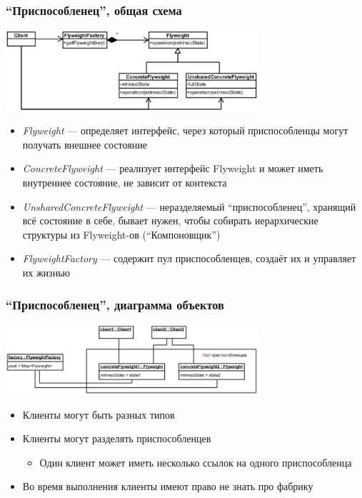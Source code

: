\documentclass[xetex,mathserif,serif]{beamer}
\begin{document}
    \begin{frame}
        \frametitle{``Приспособленец'', общая схема}
        \begin{center}
            \includegraphics[width=0.7\textwidth]{flyweight.png}
        \end{center}
        \begin{footnotesize}
            \begin{itemize}
                \item \textit{Flyweight} --- определяет интерфейс, через который приспособленцы могут получать внешнее состояние
                \item \textit{ConcreteFlyweight} --- реализует интерфейс Flyweight и может иметь внутреннее состояние, не зависит от контекста
                \item \textit{UnsharedConcreteFlyweight} --- неразделяемый ``приспособленец'', хранящий всё состояние в себе, бывает нужен, чтобы собирать иерархические структуры из Flyweight-ов (``Компоновщик'')
                \item \textit{FlyweightFactory} --- содержит пул приспособленцев, создаёт их и управляет их жизнью
            \end{itemize}
        \end{footnotesize}
    \end{frame}

    \begin{frame}
        \frametitle{``Приспособленец'', диаграмма объектов}
        \begin{center}
            \includegraphics[width=0.7\textwidth]{flyweightObjects.png}
        \end{center}
        \begin{itemize}
            \item Клиенты могут быть разных типов
            \item Клиенты могут разделять приспособленцев
            \begin{itemize}
                \item Один клиент может иметь несколько ссылок на одного приспособленца
            \end{itemize}
            \item Во время выполнения клиенты имеют право не знать про фабрику
        \end{itemize}
    \end{frame}
\end{document}
